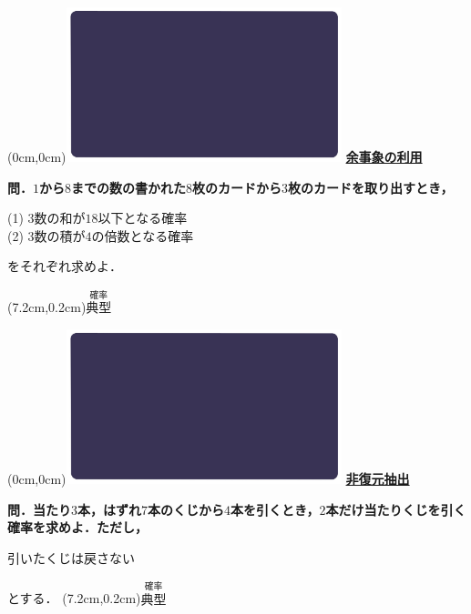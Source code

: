\documentclass[10pt,
fleqn,
dvipdfmx,
uplatex
]{jsarticle}
\begin{document}
\newpage

\at(0cm,0cm){\includegraphics[width=8cm,bb=0 0 1920 1080]{./youtube/thumbnails/templates/smart_background/確率.jpeg}}
{\color{orange}\bf\boldmath\huge\underline{余事象の利用}}\vspace{0.3zw}

\normalsize
\bf\boldmath 問．$1$から$8$までの数の書かれた$8$枚のカードから$3$枚のカードを取り出すとき，

\Large
\vspace{0.0zw}
(1)  $3$数の和が${18}$以下となる確率\\
(2)  $3$数の積が$4$の倍数となる確率

\normalsize
\hfill をそれぞれ求めよ．

\at(7.2cm,0.2cm){\small\color{bradorange}$\overset{\text{確率}}{\text{典型}}$}

\newpage

\at(0cm,0cm){\includegraphics[width=8cm,bb=0 0 1920 1080]{./youtube/thumbnails/templates/smart_background/確率.jpeg}}
{\color{orange}\bf\boldmath\huge\underline{非復元抽出}}\vspace{0.3zw}

\large 
\bf\boldmath 問．当たり$3$本，はずれ$7$本のくじから$4$本を引くとき，$2$本だけ当たりくじを引く確率を求めよ．ただし，

\huge
\vspace{-0.2zw}
\hspace{0.1zw}
引いたくじは戻さない
\vspace{0.1zw}

\large 
\hfill とする．
\at(7.2cm,0.2cm){\small\color{bradorange}$\overset{\text{確率}}{\text{典型}}$}
\end{document}
